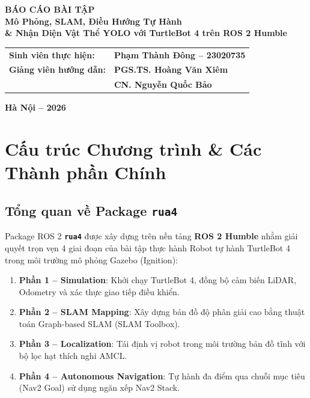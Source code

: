 \documentclass[12pt, a4paper]{article}
\begin{document}
\begin{titlepage}
\begin{center}
        \vspace{1.5cm}
        
        {\LARGE \textbf{BÁO CÁO BÀI TẬP}}\\[0.4cm]
        {\huge \textbf{Mô Phỏng, SLAM, Điều Hướng Tự Hành}}\\[0.2cm]
        {\Large \textbf{\& Nhận Diện Vật Thể YOLO với TurtleBot 4 trên ROS 2 Humble}}
        
        \vfill
        
        \begin{tabular}{ll}
            \textbf{Sinh viên thực hiện:} & \textbf{Phạm Thành Đông -- 23020735} \\[0.4cm]
            \textbf{Giảng viên hướng dẫn:} & \textbf{PGS.TS. Hoàng Văn Xiêm} \\[0.2cm]
                                           & \textbf{CN. Nguyễn Quốc Bảo} \\
        \end{tabular}
        
        \vspace{1.0cm}
        {\normalsize \textbf{Hà Nội -- 2026}}
        \vspace*{0.3cm}
    \end{center}
\end{titlepage}

\newpage
\tableofcontents
\newpage


\section{Cấu trúc Chương trình \& Các Thành phần Chính}

\subsection{Tổng quan về Package \texttt{rua4}}
Package ROS 2 \textbf{\texttt{rua4}} được xây dựng trên nền tảng \textbf{ROS 2 Humble} nhằm giải quyết trọn vẹn 4 giai đoạn của bài tập thực hành Robot tự hành TurtleBot 4 trong môi trường mô phỏng Gazebo (Ignition):
\begin{enumerate}
    \item \textbf{Phần 1 -- Simulation}: Khởi chạy TurtleBot 4, đồng bộ cảm biến LiDAR, Odometry và xác thực giao tiếp điều khiển.
    \item \textbf{Phần 2 -- SLAM Mapping}: Xây dựng bản đồ độ phân giải cao bằng thuật toán Graph-based SLAM (SLAM Toolbox).
    \item \textbf{Phần 3 -- Localization}: Tái định vị robot trong môi trường bản đồ tĩnh với bộ lọc hạt thích nghi AMCL.
    \item \textbf{Phần 4 -- Autonomous Navigation}: Tự hành đa điểm qua chuỗi mục tiêu (Nav2 Goal) sử dụng ngăn xếp Nav2 Stack.
\end{enumerate}
\end{document}

